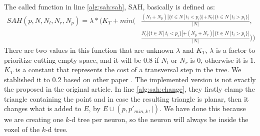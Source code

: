  The called function in line \ref{alg:sah:sah}, SAH, basically is defined as:
\begin{align*}
  SAH(p,N,N_l,N_r,N_p) = \lambda * (K_T + min(&\frac{(N_l+N_p)|\{t\in N\, |\, t_i < p_i\}|+N_r|\{t\in N\, |\, t_i > p_i\}|}{|N|},\\
  &\frac{N_l|\{t\in N\, |\, t_i < p_i\}|+(N_p+N_r)|\{t\in N\, |\, t_i > p_i\}|}{|N|}))
\end{align*}
There are two values in this function that are unknown $\lambda$ and $K_T$, $\lambda$ is a factor to prioritize cutting empty space, and it will be $0.8$ if $N_l$ or $N_r$ is $0$, otherwise it is $1$. $K_T$ is a constant that represents the cost of a transversal step in the tree. We stablished it to $0.2$ based on other paper \cite{Yucheng}. The implemented version is not exactly the proposed in the original article. In line \ref{alg:sah:change}, they firstly clamp the triangle containing the point and in case the resulting triangle is planar, then it changes what is added to $E$, by $E \cup (p, p'_{min,k}, |)$. We have done this because we are creating one $k$-d tree per neuron, so the neuron will always be inside the voxel of the $k$-d tree.


